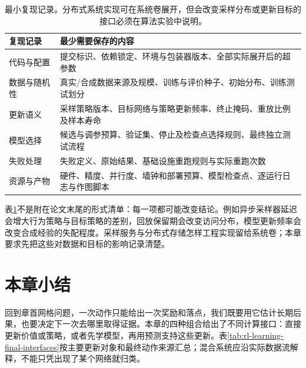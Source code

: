 \begin{table}[t]
  \centering
  \small
  \begin{tabularx}{\linewidth}{>{\raggedright\arraybackslash}p{28mm} >{\raggedright\arraybackslash}X}
    \toprule
    复现记录 & 最少需要保存的内容 \\
    \midrule
    代码与配置 & 提交标识、依赖锁定、环境与包装器版本、全部实际展开后的超参数 \\
    数据与随机性 & 真实/合成数据来源及规模、训练与评价种子、初始分布、训练测试划分 \\
    更新语义 & 采样策略版本、目标网络与策略更新频率、终止掩码、重放比例及样本寿命 \\
    模型选择 & 候选与调参预算、验证集、停止及检查点选择规则、最终独立测试流程 \\
    失败处理 & 失败定义、原始结果、基础设施重跑规则与实际重跑次数 \\
    资源与产物 & 硬件、精度、并行度、墙钟和部署预算、模型检查点、逐运行日志与作图脚本 \\
    \bottomrule
  \end{tabularx}
  \caption{最小复现记录。分布式系统实现可在系统卷展开，但会改变采样分布或更新目标的接口必须在算法实验中说明。}
  \label{tab:rl-learning-reproducibility}
\end{table}

表\ref{tab:rl-learning-reproducibility}不是附在论文末尾的形式清单：每一项都可能改变结论。例如异步采样器延迟会增大行为策略与目标策略的差别，回放保留期会改变访问分布，模型更新频率会改变合成经验的失配程度。采样服务与分布式存储怎样工程实现留给系统卷；本章要求先把这些对数据和目标的影响记录清楚。

\section{本章小结}
\label{sec:rl-learning-summary}

回到章首网格问题，一次动作只能给出一次奖励和落点，我们既要用它估计长期后果，也要决定下一次去哪里取得证据。本章的四种组合给出了不同计算接口：直接更新价值或策略，或者先学模型，再用预测支持这些更新。表\ref{tab:rl-learning-final-interfaces}按主要更新对象和最终动作来源汇总；混合系统应沿实际数据流解释，不能只凭出现了某个网络就归类。


